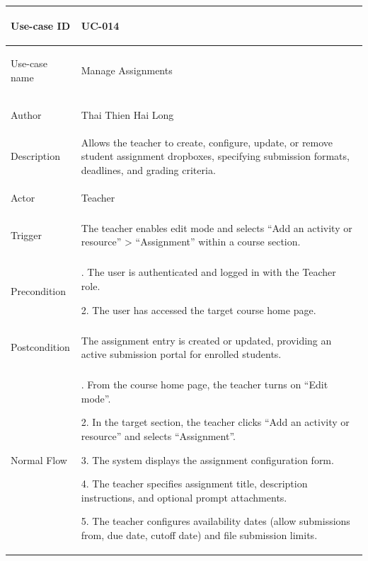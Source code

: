 {
\renewcommand{\arraystretch}{1.1}
\setlength{\tabcolsep}{8pt}
\begin{longtable}{|>{\bfseries\raggedright\arraybackslash}p{}|>{\raggedright\arraybackslash}p{}|}
\hline
Use-case ID & UC-014 \\ \hline
Use-case name & Manage Assignments \\ \hline
Author & Thai Thien Hai Long \\ \hline
Description &
Allows the teacher to create, configure, update, or remove student assignment dropboxes, specifying submission formats, deadlines, and grading criteria. \\ \hline
Actor & Teacher \\ \hline
Trigger &
The teacher enables edit mode and selects ``Add an activity or resource'' > ``Assignment'' within a course section. \\ \hline
Precondition &
1. The user is authenticated and logged in with the Teacher role. \par
2. The user has accessed the target course home page. \\ \hline
Postcondition &
The assignment entry is created or updated, providing an active submission portal for enrolled students. \\ \hline
Normal Flow &
1. From the course home page, the teacher turns on ``Edit mode''. \par
2. In the target section, the teacher clicks ``Add an activity or resource'' and selects ``Assignment''. \par
3. The system displays the assignment configuration form. \par
4. The teacher specifies assignment title, description instructions, and optional prompt attachments. \par
5. The teacher configures availability dates (allow submissions from, due date, cutoff date) and file submission limits. \par

\end{longtable}}
